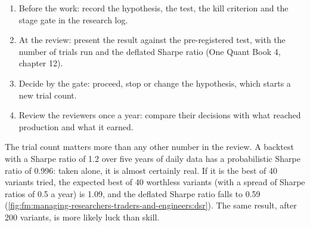 \begin{method}\label{met:fm:managing-researchers-traders-and-engineers:review}
\begin{enumerate}
\item Before the work: record the hypothesis, the test, the kill criterion and the stage gate in the research log.
\item At the review: present the result against the pre-registered test, with the number of trials run and the deflated Sharpe ratio
(One Quant Book 4, chapter 12).
\item Decide by the gate: proceed, stop or change the hypothesis, which starts a new trial count.
\item Review the reviewers once a year: compare their decisions with what reached production and what it earned.
\end{enumerate}
\end{method}

The trial count matters more than any other number in the review. A backtest with a Sharpe ratio of 1.2 over five years of daily data has a
probabilistic Sharpe ratio of 0.996: taken alone, it is almost certainly real. If it is the best of 40 variants tried, the expected best of 40
worthless variants (with a spread of Sharpe ratios of 0.5 a year) is 1.09, and the deflated Sharpe ratio falls to 0.59
(\cref{fig:fm:managing-researchers-traders-and-engineers:dsr}). The same result, after 200 variants, is more likely luck than skill.

\begin{omfigure}

\label{fig:fm:managing-researchers-traders-and-engineers:dsr}
\end{omfigure}


